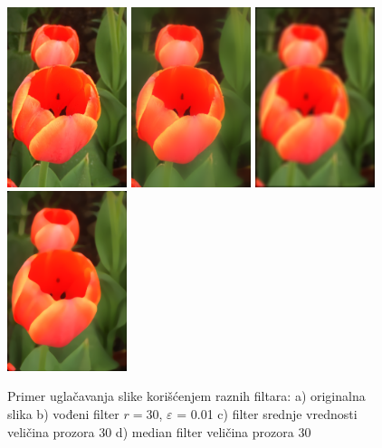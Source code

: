 \documentclass[a4paper,12pt,titlepage]{article}
\begin{document}
\begin{figure}[ht!]
\centering
\includegraphics[width=35mm]{img/flower.png}
\includegraphics[width=35mm]{img/flowerGF30_01.png}
\includegraphics[width=35mm]{img/flowerAvg30.png}
\includegraphics[width=35mm]{img/flowerMed30.png}
\caption{Primer uglačavanja slike korišćenjem raznih filtara: a) originalna slika b) vođeni filter $r = 30$, $\varepsilon$ = 0.01 c) filter srednje vrednosti veličina prozora 30 d) median filter veličina prozora 30 }
\label{flowerGF}
\end{figure}
\end{document}
